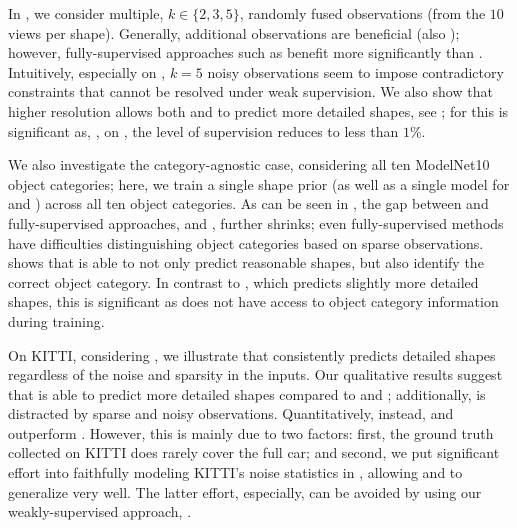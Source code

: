 %
In , we consider multiple, $k \in \{2,3,5\}$, randomly fused observations (from the $10$ views per shape). Generally, additional observations are beneficial (also \cf {}); however, fully-supervised approaches such as \Dai benefit more significantly than \AML. Intuitively, especially on \noisy, $k = 5$ noisy observations seem to impose contradictory constraints that cannot be resolved under weak supervision. We also show that higher resolution allows both \AML and \Dai to predict more detailed shapes, see ; for \AML this is significant as, \eg, on \noisy, the level of supervision reduces to less than $1\%$. 

%
We also investigate the category-agnostic case, considering all ten ModelNet10 object categories; here, we train a single \DVAE shape prior (as well as a single model for \Dai and \Sup) across all ten object categories. As can be seen in , the gap between \AML and fully-supervised approaches, \Dai and \Sup, further shrinks; even fully-supervised methods have difficulties distinguishing object categories based on sparse observations.  shows that \AML is able to not only predict reasonable shapes, but also identify the correct object category. In contrast to \Dai, which predicts slightly more detailed shapes, this is significant as \AML does not have access to object category information during training.

%
On KITTI, considering , we illustrate that \AML consistently predicts detailed shapes regardless of the noise and sparsity in the inputs. Our qualitative results suggest that \AML is able to predict more detailed shapes compared to \Dai and \Engelmann; additionally, \Engelmann is distracted by sparse and noisy observations. Quantitatively, instead, \Dai and \Sup outperform \AML. However, this is mainly due to two factors: first, the ground truth collected on KITTI does rarely cover the full car; and second, we put significant effort into faithfully modeling KITTI's noise statistics in \noisy, allowing \Dai and \Sup to generalize very well. The latter effort, especially, can be avoided by using our weakly-supervised approach, \AML.

